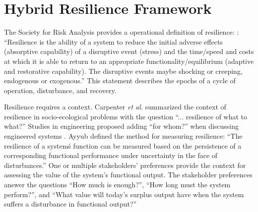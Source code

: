 \documentclass[preprint,12pt]{elsarticle}
\begin{document}
\section{Hybrid Resilience Framework}
\label{s:HRF}



The Society for Risk Analysis provides a operational definition of
resilience: \cite{SRA2016}: ``Resilience is the ability of a system to
reduce the initial adverse effects (absorptive capability) of a
disruptive event (stress) and the time/speed and costs at which it
is able to return to an appropriate functionality/equilibrium
(adaptive and restorative capability). The disruptive events maybe
shocking or creeping, endogenous or exogenous.'' This statement
describes the epochs of a cycle of operation, disturbance, and
recovery.


Resilience requires a context. Carpenter \emph{et al.}
\cite{Carpenter2001} summarized the context of resilience in
socio-ecological problems with the question ``... resilience of what
to what?''  Studies in engineering proposed adding ``for whom?'' when
discussing engineered systems \cite{Emanuel2017,Emanuel2018}. 
Ayyub \cite{Ayyub2014a} defined the method for measuring
resilience: ``The resilience of a system\'s function can be measured
based on the persistence of a corresponding functional performance
under uncertainty in the face of disturbances.'' One or multiple
stakeholders' preferences provide the context for assessing the value
of the system's functional output. The stakeholder preferences answer
the questions ``How much is enough?'', ``How long must the system
perform?'', and ``What value will today's surplus output have when the
system suffers a disturbance in functional output?''
\cite{Emanuel2017,Emanuel2018} 
\end{document}
